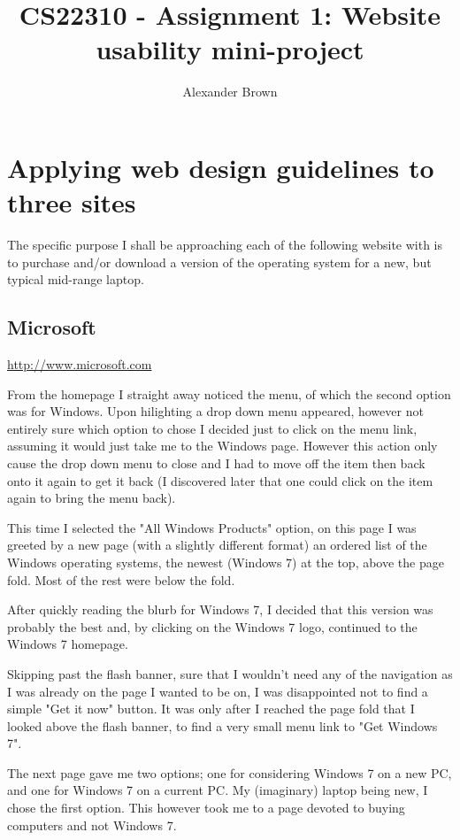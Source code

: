 \documentclass[10pt,letterpaper]{article}
\title{CS22310 - Assignment 1: Website usability mini-project}
\author{Alexander Brown}
\begin{document}
  \maketitle
  \section{Applying web design guidelines to three sites}
      The specific purpose I shall be approaching each of the following website with is to purchase and/or download a version of the operating system for a new, but typical mid-range laptop.
    
    \subsection{Microsoft}
      \url{http://www.microsoft.com}
      
      From the homepage I straight away noticed the menu, of which the second option was for Windows. Upon hilighting a drop down menu appeared, however not entirely sure which option to chose I decided just to click on the menu link, assuming it would just take me to the Windows page. However this action only cause the drop down menu to close and I had to move off the item then back onto it again to get it back (I discovered later that one could click on the item again to bring the menu back).
      
      This time I selected the "All Windows Products" option, on this page I was greeted by a new page (with a slightly different format) an ordered list of the Windows operating systems, the newest (Windows 7) at the top, above the page fold. Most of the rest were below the fold.
      
      After quickly reading the blurb for Windows 7, I decided that this version was probably the best and, by clicking on the Windows 7 logo, continued to the Windows 7 homepage.
      
      Skipping past the flash banner, sure that I wouldn't need any of the navigation as I was already on the page I wanted to be on, I was disappointed not to find a simple "Get it now" button. It was only after I reached the page fold that I looked above the flash banner, to find a very small menu link to "Get Windows 7".
      
      The next page gave me two options; one for considering Windows 7 on a new PC, and one for Windows 7 on a current PC. My (imaginary) laptop being new, I chose the first option. This however took me to a page devoted to buying computers and not Windows 7.
      
\end{document}
